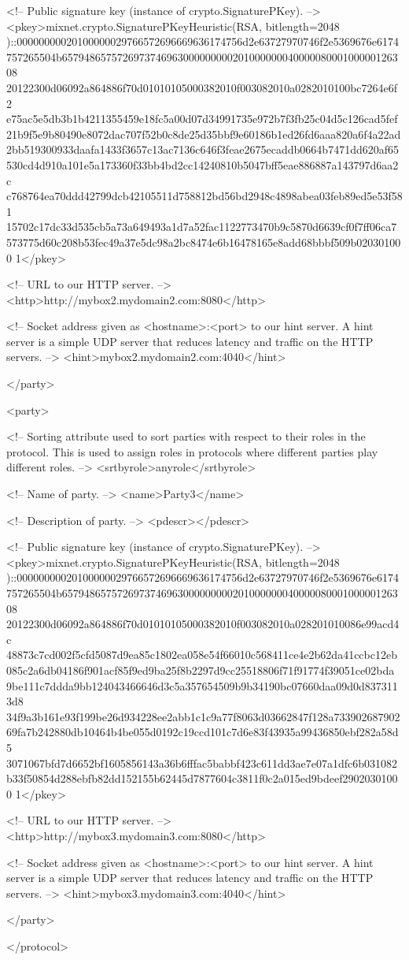       <!-- Public signature key (instance of crypto.SignaturePKey). -->
      <pkey>mixnet.crypto.SignaturePKeyHeuristic(RSA, bitlength=2048
)::00000000020100000029766572696669636174756d2e63727970746f2e5369676e6174
757265504b657948657572697374696300000000020100000004000008000100000126308
20122300d06092a864886f70d01010105000382010f003082010a0282010100bc7264e6f2
e75ac5e5db3b1b4211355459e18fc5a00d07d34991735e972b7f3fb25c04d5c126cad5fef
21b9f5e9b80490e8072dac707f52b0c8de25d35bbf9e60186b1ed26fd6aaa820a6f4a22ad
2bb519300933daafa1433f3657c13ac7136c646f3feae2675ecaddb0664b7471dd620af65
530cd4d910a101e5a173360f33bb4bd2cc14240810b5047bff5eae886887a143797d6aa2c
c768764ea70ddd42799dcb42105511d758812bd56bd2948c4898abea03feb89ed5e53f581
15702c17dc33d535cb5a73a649493a1d7a52fac1122773470b9c5870d6639cf0f7ff06ca7
573775d60c208b53fec49a37e5dc98a2bc8474e6b16478165e8add68bbbf509b020301000
1</pkey>

      <!-- URL to our HTTP server. -->
      <http>http://mybox2.mydomain2.com:8080</http>

      <!-- Socket address given as <hostname>:<port> to our hint server. 
           A hint server is a simple UDP server that reduces latency and 
           traffic on the HTTP servers. -->
      <hint>mybox2.mydomain2.com:4040</hint>

   </party>

   <party>

      <!-- Sorting attribute used to sort parties with respect to their 
           roles in the protocol. This is used to assign roles in 
           protocols where different parties play different roles. -->
      <srtbyrole>anyrole</srtbyrole>

      <!-- Name of party. -->
      <name>Party3</name>

      <!-- Description of party. -->
      <pdescr></pdescr>

      <!-- Public signature key (instance of crypto.SignaturePKey). -->
      <pkey>mixnet.crypto.SignaturePKeyHeuristic(RSA, bitlength=2048
)::00000000020100000029766572696669636174756d2e63727970746f2e5369676e6174
757265504b657948657572697374696300000000020100000004000008000100000126308
20122300d06092a864886f70d01010105000382010f003082010a028201010086e99acd4c
48873c7cd002f5cfd5087d9ea85c1802ea058e54f66010c568411ce4e2b62da41ccbc12eb
085c2a6db04186f901acf85f9ed9ba25f8b2297d9cc25518806f71f91774f39051ce02bda
9be111c7ddda9bb124043466646d3c5a357654509b9b34190bc07660daa09d0d8373113d8
34f9a3b161e93f199be26d934228ee2abb1c1c9a77f8063d03662847f128a733902687902
69fa7b242880db10464b4be055d0192c19ccd101c7d6e83f43935a99436850ebf282a58d5
3071067bfd7d6652bf1605856143a36b6fffac5babbf423c611dd3ae7e07a1dfc6b031082
b33f50854d288ebfb82dd152155b62445d7877604c3811f0c2a015ed9bdeef29020301000
1</pkey>

      <!-- URL to our HTTP server. -->
      <http>http://mybox3.mydomain3.com:8080</http>

      <!-- Socket address given as <hostname>:<port> to our hint server. 
           A hint server is a simple UDP server that reduces latency and 
           traffic on the HTTP servers. -->
      <hint>mybox3.mydomain3.com:4040</hint>

   </party>

</protocol>

